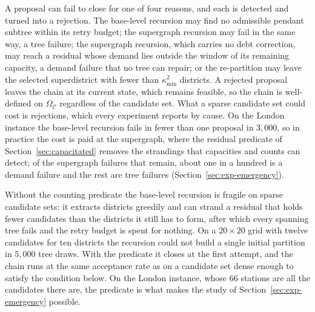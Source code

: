 \documentclass[preprint,12pt,authoryear]{elsarticle}
\theoremstyle{definition}
\begin{document}
A proposal can fail to close for one of four reasons, and each is detected and turned into a rejection. The base-level recursion may find no admissible pendant subtree within its retry budget; the supergraph recursion may fail in the same way, a tree failure; the supergraph recursion, which carries no debt correction, may reach a residual whose demand lies outside the window of its remaining capacity, a demand failure that no tree can repair; or the re-partition may leave the selected superdistrict with fewer than $\kappa^2_{\min}$ districts. A rejected proposal leaves the chain at its current state, which remains feasible, so the chain is well-defined on $\Omega_{\mathcal{C}}$ regardless of the candidate set. What a sparse candidate set could cost is rejections, which every experiment reports by cause. On the London instance the base-level recursion fails in fewer than one proposal in $3{,}000$, so in practice the cost is paid at the supergraph, where the residual predicate of Section~\ref{sec:capacitated} removes the strandings that capacities and counts can detect; of the supergraph failures that remain, about one in a hundred is a demand failure and the rest are tree failures (Section~\ref{sec:exp-emergency}).

Without the counting predicate the base-level recursion is fragile on
sparse candidate sets: it extracts districts greedily and can strand a
residual that holds fewer candidates than the districts it still has to
form, after which every spanning tree fails and the retry budget is spent
for nothing. On a $20\times20$ grid with twelve candidates for ten districts the recursion could not build a single initial partition in $5{,}000$ tree draws. With the predicate it closes at the first attempt, and the chain runs at the same acceptance rate as on a candidate set dense enough to satisfy the condition below. On the London instance,
whose $66$ stations are all the candidates there are, the predicate is
what makes the study of Section~\ref{sec:exp-emergency} possible.
\end{document}
